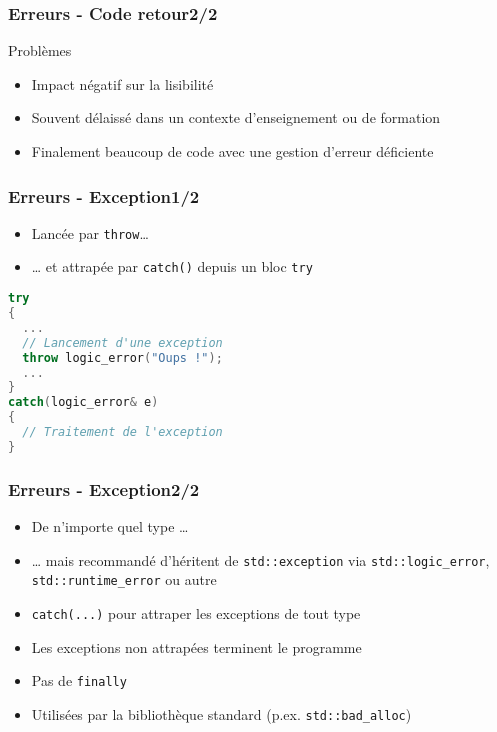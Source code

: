 \documentclass[C++.tex]{subfiles}
\begin{document}
\begin{frame}
	\frametitle{Erreurs -  Code retour\titlehfill{}2/2}
	\begin{alertblock}{Problèmes}
		\begin{itemize}
			\item Impact négatif sur la lisibilité
			\item Souvent délaissé dans un contexte d'enseignement ou de formation


			\item Finalement beaucoup de code avec une gestion d'erreur déficiente
		\end{itemize}
	\end{alertblock}
\end{frame}

\begin{frame}[fragile]
	\frametitle{Erreurs - Exception\titlehfill{}1/2}
	\begin{itemize}
		\item Lancée par \lstinline|throw|\dots{}
		\item \dots{} et attrapée par \lstinline|catch()| depuis un bloc \lstinline|try|
	\end{itemize}

	\begin{lstlisting}[language=C++]
try
{
  ...
  // Lancement d'une exception
  throw logic_error("Oups !");
  ...
}
catch(logic_error& e)
{
  // Traitement de l'exception
}\end{lstlisting}
\end{frame}

\begin{frame}
	\frametitle{Erreurs - Exception\titlehfill{}2/2}
	\begin{itemize}
		\item De n'importe quel type \dots{}
		\item \dots{} mais recommandé d'héritent de \lstinline|std::exception| via \lstinline|std::logic_error|, \lstinline|std::runtime_error| ou autre
		\item \lstinline{catch(...)} pour attraper les exceptions de tout type
		\item Les exceptions non attrapées terminent le programme
		\item Pas de \lstinline[keywordstyle=\color{black}]|finally|
		\item Utilisées par la bibliothèque standard (p.ex. \lstinline|std::bad_alloc|)
	\end{itemize}
\end{frame}
\end{document}
